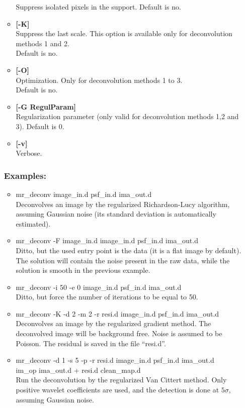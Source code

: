 \begin{itemize}
\begin{itemize}
Suppress isolated pixels in the support. Default is no.
\item {\bf [-K]} \\
Suppress the last scale.  
This option is available only for deconvolution methods 1 and 2. \\
Default is no.
\item {\bf [-O]} \\
Optimization. Only for deconvolution methods 1 to 3. \\
Default is no.
\item {\bf [-G RegulParam]} \\
 Regularization parameter (only valid for deconvolution methods 1,2 and 3).
 Default is 0. 
\item {\bf [-v]} \\
Verbose.
\end{itemize}
\noindent
\subsubsection*{Examples:}
\begin{itemize}
\baselineskip=0.4truecm
\item mr\_deconv image\_in.d psf\_in.d ima\_out.d \\
Deconvolves an image by the regularized Richardson-Lucy algorithm, assuming
 Gaussian noise (its standard deviation is automatically estimated).
\item mr\_deconv -F image\_in.d image\_in.d psf\_in.d ima\_out.d \\
Ditto, but the used entry point is the data (it is a flat image by default). 
The solution will contain
the noise present in the raw data, while the solution is smooth in
the previous example.
\item mr\_deconv -i 50 -e 0 image\_in.d psf\_in.d ima\_out.d \\
Ditto, but force the number of iterations to be equal to 50.
\item mr\_deconv -K -d 2 -m 2 -r resi.d image\_in.d psf\_in.d ima\_out.d \\
Deconvolves an image by the regularized gradient method. The deconvolved
image will be background free. Noise is assumed to be Poisson. The residual
is saved in the file ``resi.d''.
\item mr\_deconv -d 1 -s 5 -p -r resi.d image\_in.d psf\_in.d ima\_out.d \\
im\_op ima\_out.d + resi.d clean\_map.d \\
Run the deconvolution by the regularized Van Cittert method. Only positive
wavelet coefficients are used, and the detection is done at $5\sigma$, assuming
Gaussian noise.
\end{itemize}



\end{itemize}
